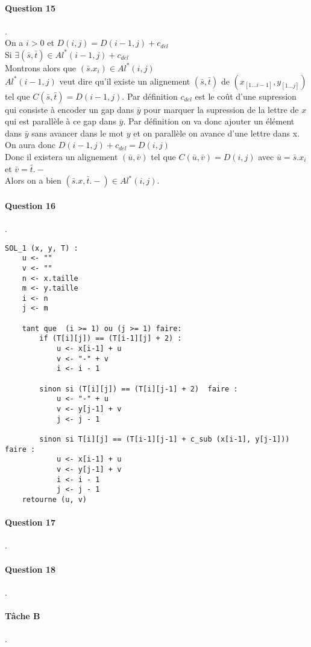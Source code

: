 \paragraph{Question 15}.\\
On a $i > 0$ et $D(i,j) = D(i-1,j)+c_{del}$\\
Si $\exists(\bar s, \bar t) \in Al^*(i-1,j)+c_{del}$\\
Montrons alors que $(\bar s.x_i)\in Al^*(i,j)$\\
$Al^*(i-1,j)$ veut dire qu'il existe un alignement $(\bar s, \bar t)$ de $(x_[1...i-1], y_[1...j])$ tel que $C(\bar s, \bar t) = D(i-1, j)$. Par définition $c_{del}$ est le coût d'une supression qui consiste à encoder un gap dans $\bar y$ pour marquer la supression de la lettre de $x$ qui est parallèle à ce gap dans $\bar y$.
Par définition on va donc ajouter un élément dans $\bar y$ sans avancer dans le mot $y$ et on parallèle on avance d'une lettre dans x.\\
On aura donc $D(i-1,j)+c_{del} = D(i,j)$\\
Donc il existera un alignement $(\bar u, \bar v)$ tel que $C(\bar u, \bar v) = D(i,j)$ avec $\bar u = \bar s.x_i$ et $\bar v = \bar t.-$\\
Alors on a bien $(\bar s.x, \bar t.-) \in Al^*(i,j)$.
\paragraph{Question 16}.\\
\begin{lstlisting}
SOL_1 (x, y, T) :
    u <- ""
    v <- ""
    n <- x.taille
    m <- y.taille
    i <- n
    j <- m

    tant que  (i >= 1) ou (j >= 1) faire:
        if (T[i][j]) == (T[i-1][j] + 2) :
            u <- x[i-1] + u
            v <- "-" + v
            i <- i - 1

        sinon si (T[i][j]) == (T[i][j-1] + 2)  faire :
            u <- "-" + u
            v <- y[j-1] + v
            j <- j - 1

        sinon si T[i][j] == (T[i-1][j-1] + c_sub (x[i-1], y[j-1])) faire :
            u <- x[i-1] + u
            v <- y[j-1] + v
            i <- i - 1
            j <- j - 1
    retourne (u, v)
\end{lstlisting}
\paragraph{Question 17}.\\
\paragraph{Question 18}.\\
\paragraph{Tâche B}.\\
